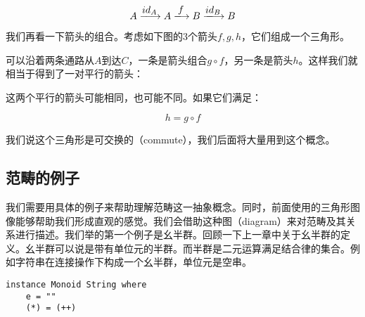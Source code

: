 \documentclass{article}
\begin{document}
\[
A \arrowto{id_A} A \arrowto{f} B \arrowto{id_B} B
\]

我们再看一下箭头的组合。考虑如下图的3个箭头$f, g, h$，它们组成一个三角形。

\begin{center}
\end{center}

可以沿着两条通路从$A$到达$C$，一条是箭头组合$g \circ f$，另一条是箭头$h$。这样我们就相当于得到了一对平行的箭头：

\begin{center}
\end{center}

这两个平行的箭头可能相同，也可能不同。如果它们满足：

\[
h = g \circ f
\]

我们说这个三角形是可交换的（commute），我们后面将大量用到这个概念。

\subsection{范畴的例子}

我们需要用具体的例子来帮助理解范畴这一抽象概念。同时，前面使用的三角形图像能够帮助我们形成直观的感觉。我们会借助这种图（diagram）来对范畴及其关系进行描述。我们举的第一个例子是幺半群。回顾一下上一章中关于幺半群的定义。幺半群可以说是带有单位元的半群。而半群是二元运算满足结合律的集合。例如字符串在连接操作下构成一个幺半群，单位元是空串。

\begin{lstlisting}
instance Monoid String where
    e = ""
    (*) = (++)
\end{lstlisting}
\end{document}
